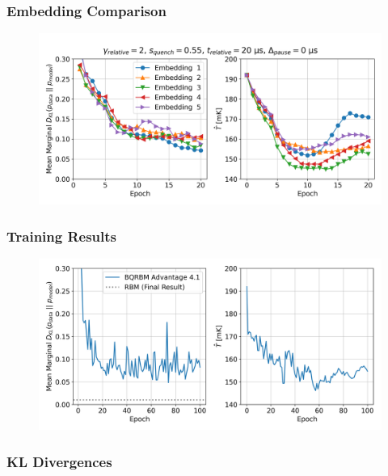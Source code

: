 \documentclass{beamer}
\begin{document}
\begin{frame}
    \frametitle{Embedding Comparison}
    \begin{figure}
        \includegraphics[width=1\linewidth]{qbm/log_returns/embedding_comparison.png}
    \end{figure}
\end{frame}

\begin{frame}
    \frametitle{Training Results}
    \begin{figure}
        \includegraphics[width=1\linewidth]{qbm/log_returns/full_run.png}
    \end{figure}
\end{frame}

\begin{frame}
    \frametitle{KL Divergences}
    \begin{table}[!htb]
        \centering
        \begin{adjustbox}{max width=\textwidth}
            
        \end{adjustbox}
    \end{table}
\end{frame}

\end{document}
